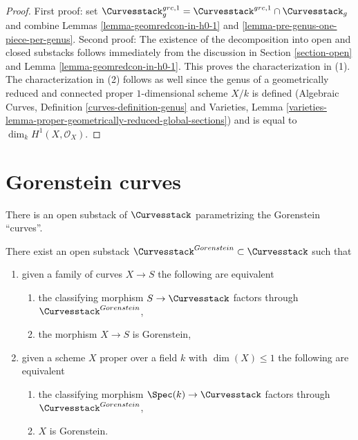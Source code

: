 \begin{proof}
First proof: set
$\Curvesstack^{grc, 1}_g = \Curvesstack^{grc, 1} \cap \Curvesstack_g$
and combine Lemmas \ref{lemma-geomredcon-in-h0-1} and
\ref{lemma-pre-genus-one-piece-per-genus}.
Second proof:
The existence of the decomposition into open and closed substacks
follows immediately from the discussion in Section \ref{section-open}
and Lemma \ref{lemma-geomredcon-in-h0-1}.
This proves the characterization in (1).
The characterization in (2) follows as well since
the genus of a geometrically reduced and connected
proper $1$-dimensional scheme $X/k$ is defined
(Algebraic Curves, Definition \ref{curves-definition-genus} and
Varieties, Lemma
\ref{varieties-lemma-proper-geometrically-reduced-global-sections})
and is equal to $\dim_k H^1(X, \mathcal{O}_X)$.
\end{proof}







\section{Gorenstein curves}
\label{section-gorenstein}

\noindent
There is an open substack of $\Curvesstack$ parametrizing
the Gorenstein ``curves''.

\begin{lemma}
\label{lemma-gorenstein-curves}
There exist an open substack $\Curvesstack^{Gorenstein} \subset \Curvesstack$
such that
\begin{enumerate}
\item given a family of curves $X \to S$ the following are equivalent
\begin{enumerate}
\item the classifying morphism $S \to \Curvesstack$ factors
through $\Curvesstack^{Gorenstein}$,
\item the morphism $X \to S$ is Gorenstein,
\end{enumerate}
\item given a scheme $X$ proper over a field $k$ with $\dim(X) \leq 1$
the following are equivalent
\begin{enumerate}
\item the classifying morphism $\Spec(k) \to \Curvesstack$ factors
through $\Curvesstack^{Gorenstein}$,
\item $X$ is Gorenstein.
\end{enumerate}
\end{enumerate}
\end{lemma}

